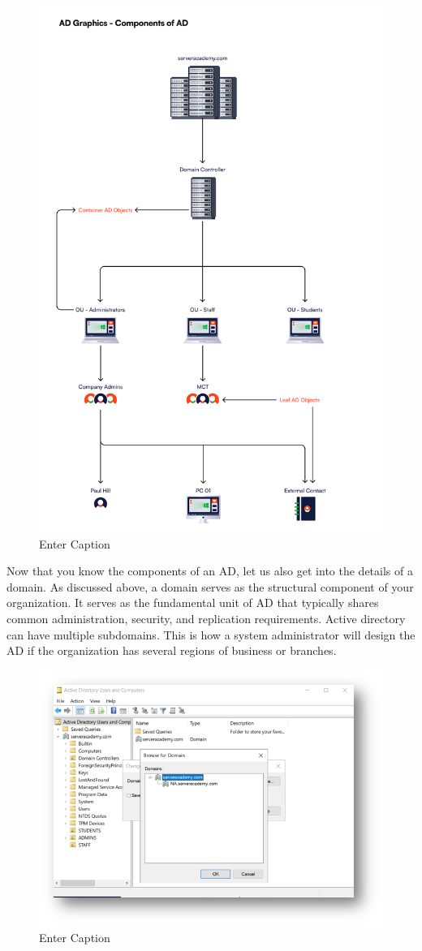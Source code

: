 \begin{figure}
    \centering
    \includegraphics[width=0.75\linewidth]{adcomp2.png}
    \caption{Enter Caption}
    \label{fig:placeholder}
\end{figure}

Now that you know the components of an AD, let us also get into the details of a domain. As discussed above, a domain serves as the structural component of your organization. It serves as the fundamental unit of AD that typically shares common administration, security, and replication requirements. Active directory can have multiple subdomains. This is how a system administrator will design the AD if the organization has several regions of business or branches. 

\begin{figure}
    \centering
    \includegraphics[width=0.75\linewidth]{aduc1.png}
    \caption{Enter Caption}
    \label{fig:placeholder}
\end{figure}

